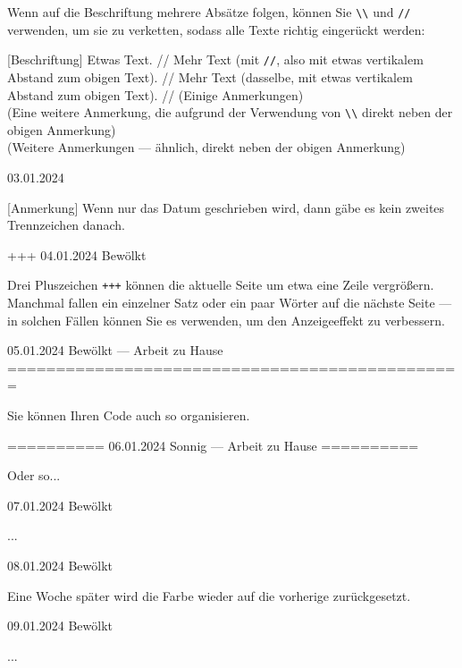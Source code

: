 \documentclass[11pt, paperstyle=light yellow, color entry, day-month-year,
  title in boldface, title in sffamily, use style = classical]{jwjournal}
\begin{document}
  Wenn auf die Beschriftung mehrere Absätze folgen, können Sie \texttt{\textbackslash\textbackslash} und \texttt{\slash\slash} verwenden, um sie zu verketten, sodass alle Texte richtig eingerückt werden:

  [Beschriftung] Etwas Text.
    //
    Mehr Text (mit \texttt{\slash\slash}, also mit etwas vertikalem Abstand zum obigen Text).
    //
    Mehr Text (dasselbe, mit etwas vertikalem Abstand zum obigen Text).
    //
    (Einige Anmerkungen)
    \\
    (Eine weitere Anmerkung, die aufgrund der Verwendung von \texttt{\textbackslash\textbackslash} direkt neben der obigen Anmerkung)
    \\
    (Weitere Anmerkungen --- ähnlich, direkt neben der obigen Anmerkung)



03.01.2024

  [Anmerkung] Wenn nur das Datum geschrieben wird, dann gäbe es kein zweites Trennzeichen danach.


+++
04.01.2024  Bewölkt

  Drei Pluszeichen \texttt{+++} können die aktuelle Seite um etwa eine Zeile vergrößern. Manchmal fallen ein einzelner Satz oder ein paar Wörter auf die nächste Seite --- in solchen Fällen können Sie es verwenden, um den Anzeigeeffekt zu verbessern.



05.01.2024    Bewölkt       --- Arbeit zu Hause
===============================================

Sie können Ihren Code auch so organisieren.


==========
06.01.2024    Sonnig        --- Arbeit zu Hause
==========

Oder so...



07.01.2024  Bewölkt

  ...



08.01.2024  Bewölkt

  Eine Woche später wird die Farbe wieder auf die vorherige zurückgesetzt.



09.01.2024  Bewölkt

  ...
\end{document}
